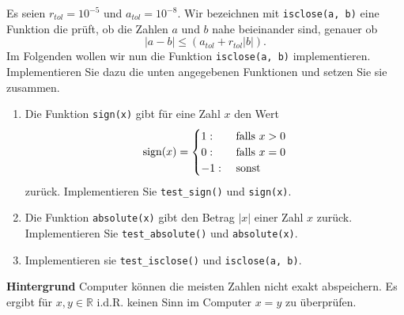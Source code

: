Es seien $r_{tol} = 10^{-5}$ und $a_{tol} = 10^{-8}$. Wir bezeichnen mit \verb|isclose(a, b)| eine Funktion die prüft, ob 
die Zahlen $a$ und $b$ nahe beieinander sind, genauer ob
$$
 |a-b| \leq (a_{tol} + r_{tol} |b|).
$$
Im Folgenden wollen wir nun die Funktion \verb|isclose(a, b)| implementieren. Implementieren Sie dazu die unten angegebenen Funktionen und setzen Sie sie zusammen.
\begin{enumerate}
\item Die Funktion \verb|sign(x)| gibt für eine Zahl $x$ den Wert
$$
	\textnormal{sign}(x) =
	\begin{cases}
		1: &\textrm{ falls } x > 0 \\
		0: &\textrm{ falls } x = 0 \\
		-1: &\textrm{ sonst }
	\end{cases}
$$
zurück. Implementieren Sie \verb|test_sign()| und \verb|sign(x)|.
\item Die Funktion \verb|absolute(x)| gibt den Betrag $|x|$ einer Zahl $x$ zurück. Implementieren Sie  \verb|test_absolute()| und \verb|absolute(x)|.
\item Implementieren sie \verb|test_isclose()| und \verb|isclose(a, b)|.
\end{enumerate}

\textbf{Hintergrund} Computer können die meisten Zahlen nicht exakt abspeichern. Es ergibt für $x,y \in \mathbb{R}$ i.d.R. keinen Sinn
im Computer $x=y$ zu überprüfen.  \\